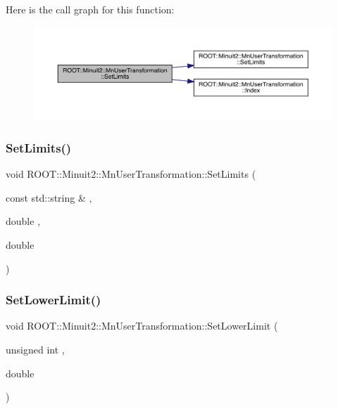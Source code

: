 Here is the call graph for this function\+:\nopagebreak
\begin{figure}[H]
\begin{center}
\leavevmode
\includegraphics[width=350pt]{d9/d98/classROOT_1_1Minuit2_1_1MnUserTransformation_ae00c15c6e7def8b4c1c1c9d44b52e647_cgraph}
\end{center}
\end{figure}
\mbox{\label{classROOT_1_1Minuit2_1_1MnUserTransformation_ae00c15c6e7def8b4c1c1c9d44b52e647}} 
\subsubsection{\texorpdfstring{SetLimits()}{SetLimits()}\hspace{0.1cm}{\footnotesize\ttfamily [4/4]}}
{\footnotesize\ttfamily void R\+O\+O\+T\+::\+Minuit2\+::\+Mn\+User\+Transformation\+::\+Set\+Limits (\begin{DoxyParamCaption}\item[{const std\+::string \&}]{,  }\item[{double}]{,  }\item[{double}]{ }\end{DoxyParamCaption})}

\mbox{\label{classROOT_1_1Minuit2_1_1MnUserTransformation_a380498bdd8801393713fde4a4835402e}} 
\subsubsection{\texorpdfstring{SetLowerLimit()}{SetLowerLimit()}\hspace{0.1cm}{\footnotesize\ttfamily [1/4]}}
{\footnotesize\ttfamily void R\+O\+O\+T\+::\+Minuit2\+::\+Mn\+User\+Transformation\+::\+Set\+Lower\+Limit (\begin{DoxyParamCaption}\item[{unsigned int}]{,  }\item[{double}]{ }\end{DoxyParamCaption})}

